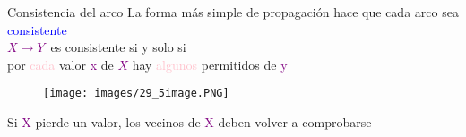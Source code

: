 \begin{frame}{Consistencia del arco}
La forma más simple de propagación hace que cada arco sea \textcolor{blue}{consistente}\\
\textcolor{Purple}{$X \longrightarrow Y$}\, es consistente si y solo si \\
por \textcolor{Pink}{cada} valor \textcolor{Purple}{x} de \textcolor{Purple}{$X$} hay \textcolor{Pink}{algunos} permitidos de \textcolor{Purple}{y}\\
\begin{figure}
    \centering
    \texttt{[image: images/29\_5image.PNG]}
\end{figure}
Si \textcolor{Purple}{X} pierde un valor, los vecinos de \textcolor{Purple}{X} deben volver a comprobarse\\
\end{frame}
